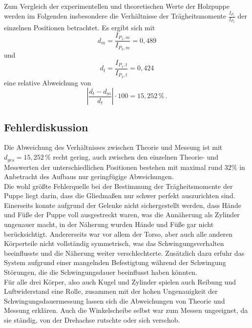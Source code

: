 Zum Vergleich der experimentellen und theoretischen Werte der Holzpuppe werden im Folgenden insbesondere die Verhältnisse der Trägheitsmomente $\frac{I_{P_1}}{I_{P_2}}$ der einzelnen Positionen betrachtet.
Es ergibt sich mit
\begin{equation*}
  d_{m}= \frac{I_{P_1,m}}{I_{P_2,m}} = 0,489
\end{equation*}
und
\begin{equation*}
  d_{t} = \frac{I_{P_1,t}}{I_{P_2,t}} = 0,424 
\end{equation*}
eine relative Abweichung von
\begin{equation*}
    \left|\frac{d_{t} - d_m}{d_t} \right| \cdot 100 = 15,252 \,\% \,.
\end{equation*}

\subsection{Fehlerdiskussion}

Die Abweichung des Verhältnisses zwischen Theorie und Messung ist mit $d_{ges} = 15,252 \,\%$ recht gering, 
auch zwischen den einzelnen Theorie- und Messwerten der unterschiedlichen Positionen bestehen mit maximal rund $32 \%$ in Anbetracht des Aufbaus nur geringfügige Abweichungen. \\

Die wohl größte Fehlerquelle bei der Bestimmung der Trägheitsmomente der Puppe liegt darin, dass die Gliedmaßen nur schwer perfekt auszurichten sind. 
Einerseits konnte aufgrund der Gelenke nicht sichergestellt werden, dass Hände und Füße der Puppe voll ausgestreckt waren, was die Annäherung als Zylinder ungenauer macht, 
in der Näherung wurden Hände und Füße gar nicht berücksichtigt.
Andererseits war vor allem der Torso, aber auch alle anderen Körperteile nicht vollständig symmetrisch, was das Schwingungsverhalten beeinflusste und die Näherung weiter verschlechterte.
Zusätzlich dazu erfuhr das System aufgrund einer mangelnden Befestigtung während der Schwingung Störungen, die die Schwingungsdauer beeinflusst haben könnten. \\

Für alle drei Körper, also auch Kugel und Zylinder spielen auch Reibung und Luftwiderstand eine Rolle, zusammen mit der hohen Ungenauigkeit der Schwingungsdauermessung 
lassen sich die Abweichungen von Theorie und Messung erklären.
Auch die Winkelscheibe selbst war zum Messen ungeeignet, da sie ständig, von der Drehachse rutschte oder sich verschob.